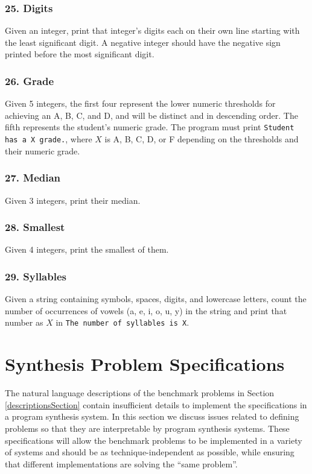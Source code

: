 \documentclass{sig-alternate}
\begin{document}
\subsubsection*{25. Digits}
Given an integer, print that integer's digits each on their own line starting with the least significant digit. A negative integer should have the negative sign printed before the most significant digit.

\subsubsection*{26. Grade}
Given 5 integers, the first four represent the lower numeric thresholds for achieving an A, B, C, and D, and will be distinct and in descending order. The fifth represents the student's numeric grade. The program must print \texttt{Student has a X grade.}, where $X$ is A, B, C, D, or F depending on the thresholds and their numeric grade.

\subsubsection*{27. Median}
Given 3 integers, print their median.

\subsubsection*{28. Smallest}
Given 4 integers, print the smallest of them.

\subsubsection*{29. Syllables}
Given a string containing symbols, spaces, digits, and lowercase letters, count the number of occurrences of vowels (a, e, i, o, u, y) in the string and print that number as $X$ in \texttt{The number of syllables is X}.

\section{Synthesis Problem Specifications} \label{synthProbSpec}

The natural language descriptions of the benchmark problems in Section \ref{descriptionsSection} contain insufficient details to implement the specifications in a program synthesis system. In this section we discuss issues related to defining problems so that they are interpretable by program synthesis systems. These specifications will allow the benchmark problems to be implemented in a variety of systems and should be as technique-independent as possible, while ensuring that different implementations are solving the ``same problem''.
\end{document}
